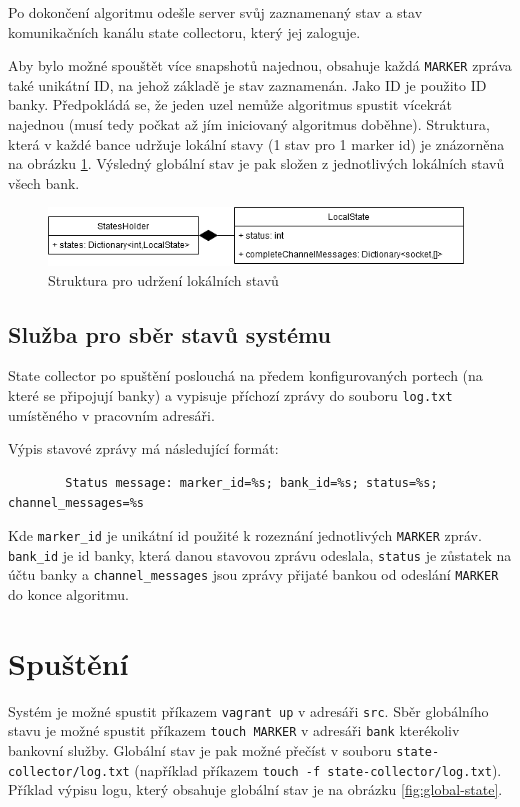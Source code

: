 \documentclass[11pt,a4paper]{scrartcl}
\begin{document}
	Po dokončení algoritmu odešle server svůj zaznamenaný stav a stav komunikačních kanálu state collectoru, který jej zaloguje. 
	
	Aby bylo možné spouštět více snapshotů najednou, obsahuje každá \verb|MARKER| zpráva také unikátní ID, na jehož základě je stav zaznamenán. Jako ID je použito ID banky. Předpokládá se, že jeden uzel nemůže algoritmus spustit vícekrát najednou (musí tedy počkat až jím iniciovaný algoritmus doběhne). Struktura, která v každé bance udržuje lokální stavy (1 stav pro 1 marker id) je znázorněna na obrázku \ref{fig:state-holder}. Výsledný globální stav je pak složen z jednotlivých lokálních stavů všech bank.
	
	\begin{figure}[H]
		\centering
		\includegraphics[width=11cm]{img/state-holder.png}
		\caption{Struktura pro udržení lokálních stavů}
		\label{fig:state-holder}
	\end{figure}
	
	\subsection{Služba pro sběr stavů systému}
	State collector po spuštění poslouchá na předem konfigurovaných portech (na které se připojují banky) a vypisuje příchozí zprávy do souboru \verb|log.txt| umístěného v pracovním adresáři.
	
	Výpis stavové zprávy má následující formát:
	
	\begin{verbatim}
		Status message: marker_id=%s; bank_id=%s; status=%s; channel_messages=%s
	\end{verbatim}
	
	Kde \verb|marker_id| je unikátní id použité k rozeznání jednotlivých \verb|MARKER| zpráv. \verb|bank_id| je id banky, která danou stavovou zprávu odeslala, \verb|status| je zůstatek na účtu banky a \verb|channel_messages| jsou zprávy přijaté bankou od odeslání \verb|MARKER| do konce algoritmu.
	
	\section{Spuštění}
	Systém je možné spustit příkazem \verb|vagrant up| v adresáři \verb|src|. Sběr globálního stavu je možné spustit příkazem \verb|touch MARKER| v adresáři \verb|bank| kterékoliv bankovní služby. Globální stav je pak možné přečíst v souboru \verb|state-collector/log.txt| (například příkazem \verb|touch -f state-collector/log.txt|). Příklad výpisu logu, který obsahuje globální stav je na obrázku \ref{fig:global-state}.
	
\end{document}
